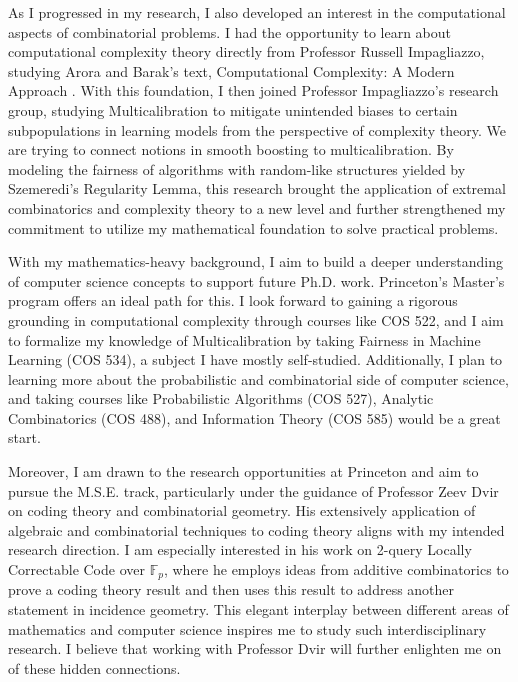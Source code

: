 \documentclass[12pt]{article}
\begin{document}
As I progressed in my research, I also developed an interest in the computational aspects of
combinatorial problems. I had the opportunity to learn about computational complexity theory
directly from Professor Russell Impagliazzo, studying Arora and Barak's text, Computational
Complexity: A Modern Approach \cite{arora2009computational}. With this foundation, I then joined
Professor Impagliazzo's research group, studying Multicalibration to mitigate unintended biases to
certain subpopulations in learning models from the perspective of complexity theory. We are trying
to connect notions in smooth boosting to multicalibration. By modeling the fairness of algorithms
with random-like structures yielded by Szemeredi's Regularity Lemma, this research brought the
application of extremal combinatorics and complexity theory to a new level and further strengthened
my commitment to utilize my mathematical foundation to solve practical problems.

With my mathematics-heavy background, I aim to build a deeper understanding of computer science
concepts to support future Ph.D. work. Princeton's Master's program offers an ideal path for this. I
look forward to gaining a rigorous grounding in computational complexity through courses like COS
522, and I aim to formalize my knowledge of Multicalibration by taking Fairness in Machine Learning
(COS 534), a subject I have mostly self-studied. Additionally, I plan to learning more about the
probabilistic and combinatorial side of computer science, and taking courses like Probabilistic
Algorithms (COS 527), Analytic Combinatorics (COS 488), and Information Theory (COS 585) would be a
great start.

Moreover, I am drawn to the research opportunities at Princeton and aim to pursue the M.S.E. track,
particularly under the guidance of Professor Zeev Dvir on coding theory and combinatorial geometry.
His extensively application of algebraic and combinatorial techniques to coding theory aligns with
my intended research direction. I am especially interested in his work on 2-query Locally
Correctable Code over $\mathbb{F}_p$\cite{6108225}, where he employs ideas from additive
combinatorics to prove a coding theory result and then uses this result to address another statement
in incidence geometry. This elegant interplay between different areas of mathematics and computer
science inspires me to study such interdisciplinary research. I believe that working with Professor
Dvir will further enlighten me on of these hidden connections.
\end{document}
